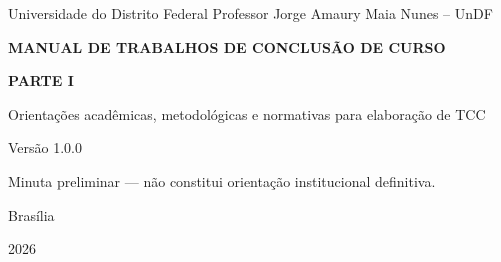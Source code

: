 \documentclass[12pt,a4paper,oneside]{report}
\begin{document}

\begin{titlepage}
  \centering
  \vspace*{1.4cm}
  {\large Universidade do Distrito Federal Professor Jorge Amaury Maia Nunes -- UnDF\par}
  \vspace{3.2cm}
  {\bfseries\Large MANUAL DE TRABALHOS DE CONCLUSÃO DE CURSO\par}
  \vspace{0.45cm}
  {\bfseries\normalsize PARTE I\par}
  \vspace{0.8cm}
  {\normalsize Orientações acadêmicas, metodológicas e normativas para elaboração de TCC\par}
  \vspace{1.2cm}
  {\small Versão 1.0.0\par}
  {\small Minuta preliminar — não constitui orientação institucional definitiva.\par}
  \vfill
  {\normalsize Brasília\par}
  {\normalsize 2026\par}
\end{titlepage}

\manualfrontmatter

\clearpage
\tableofcontents
\clearpage

\manualmainmatter



























\appendix








\clearpage

\end{document}
